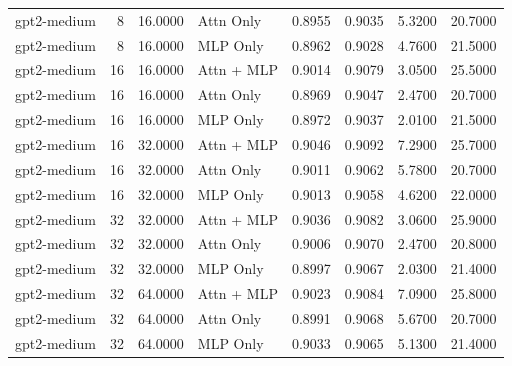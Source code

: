 \begin{tabular}{lrrlrrrr}
gpt2-medium & 8 & 16.0000 & Attn Only & 0.8955 & 0.9035 & 5.3200 & 20.7000 \\
gpt2-medium & 8 & 16.0000 & MLP Only & 0.8962 & 0.9028 & 4.7600 & 21.5000 \\
gpt2-medium & 16 & 16.0000 & Attn + MLP & 0.9014 & 0.9079 & 3.0500 & 25.5000 \\
gpt2-medium & 16 & 16.0000 & Attn Only & 0.8969 & 0.9047 & 2.4700 & 20.7000 \\
gpt2-medium & 16 & 16.0000 & MLP Only & 0.8972 & 0.9037 & 2.0100 & 21.5000 \\
gpt2-medium & 16 & 32.0000 & Attn + MLP & 0.9046 & 0.9092 & 7.2900 & 25.7000 \\
gpt2-medium & 16 & 32.0000 & Attn Only & 0.9011 & 0.9062 & 5.7800 & 20.7000 \\
gpt2-medium & 16 & 32.0000 & MLP Only & 0.9013 & 0.9058 & 4.6200 & 22.0000 \\
gpt2-medium & 32 & 32.0000 & Attn + MLP & 0.9036 & 0.9082 & 3.0600 & 25.9000 \\
gpt2-medium & 32 & 32.0000 & Attn Only & 0.9006 & 0.9070 & 2.4700 & 20.8000 \\
gpt2-medium & 32 & 32.0000 & MLP Only & 0.8997 & 0.9067 & 2.0300 & 21.4000 \\
gpt2-medium & 32 & 64.0000 & Attn + MLP & 0.9023 & 0.9084 & 7.0900 & 25.8000 \\
gpt2-medium & 32 & 64.0000 & Attn Only & 0.8991 & 0.9068 & 5.6700 & 20.7000 \\
gpt2-medium & 32 & 64.0000 & MLP Only & 0.9033 & 0.9065 & 5.1300 & 21.4000 \\
\bottomrule
\end{tabular}

